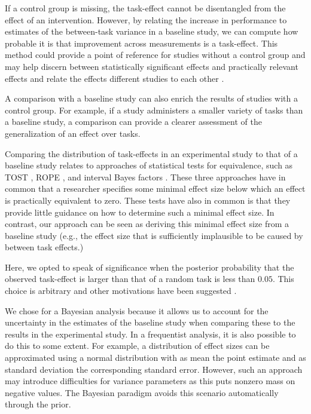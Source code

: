 \documentclass[man, mask]{apa7}
\begin{document}
If a control group is missing, the task-effect cannot be disentangled from the effect of an intervention.
However, by relating the increase in performance to estimates of the between-task variance in a baseline study, we can compute how probable it is that improvement across measurements is a task-effect.
This method could provide a point of reference for studies without a control group and may help discern between statistically significant effects and practically relevant effects and relate the effects different studies to each other \parencite{fan2001statistical, hojat2004visitor}.


A comparison with a baseline study can also enrich the results of studies with a control group.
For example, if a study administers a smaller variety of tasks than a baseline study, a comparison can provide a clearer assessment of the generalization of an effect over tasks.

Comparing the distribution of task-effects in an experimental study to that of a baseline study relates to approaches of statistical tests for equivalence, such as TOST \parencite{lakens2017equivalence}, ROPE \parencite{kruschke2011bayesian}, and interval Bayes factors \parencite{MoreyRouder2011}.
These three approaches have in common that a researcher specifies some minimal effect size below which an effect is practically equivalent to zero.
These tests have also in common is that they provide little guidance on how to determine such a minimal effect size.
In contrast, our approach can be seen as deriving this minimal effect size from a baseline study (e.g., the effect size that is sufficiently implausible to be caused by between task effects.)

Here, we opted to speak of significance when the posterior probability that the observed task-effect is larger than that of a random task is less than $0.05$. This choice is arbitrary and other motivations have been suggested \parencite{McShane2017abandon, BenjaminEtAl2018}.

We chose for a Bayesian analysis because it allows us to account for the uncertainty in the estimates of the baseline study when comparing these to the results in the experimental study.
In a frequentist analysis, it is also possible to do this to some extent.
For example, a distribution of effect sizes can be approximated using a normal distribution with as mean the point estimate and as standard deviation the corresponding standard error.
However, such an approach may introduce difficulties for variance parameters as this puts nonzero mass on negative values.
The Bayesian paradigm avoids this scenario automatically through the prior.
\end{document}
